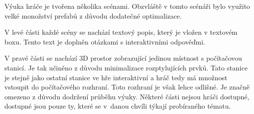 \label{sec:vyuka_scenar_reseni}
Výuka hráče je tvořena několika scénami. Obzvláště v tomto scénáři bylo využito velké monožství prefabů z důvodu dodatečné optimalizace. 

V levé části každé scény se nachází textový popis, který je vložen v textovém boxu. Tento text je doplněn otázkami s interaktivními odpověďmi.

V pravé části se nachází 3D prostor zobrazující jedinou místnost s počítačovou stanicí. Je tak učiněno z důvodu minimalizace rozptylujících prvků. Tato stanice je stejně jako ostatní stanice ve hře interaktivní a hráč tedy má množnost vstoupit do počítačového rozhraní. Toto rozhraní je však lehce odlišné. Je značně omezeno z důvodu dodržení průběhu výuky. Některé části nejsou hráči dostupné, dostupné jsou pouze ty, které se v~danou chvíli týkají probíraného tématu.